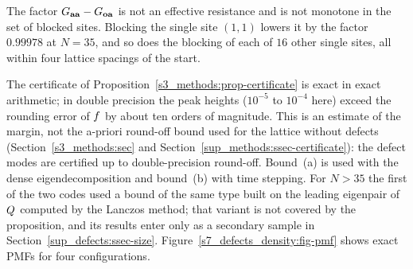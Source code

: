 The factor $G_{\mathbf{a}\mathbf{a}}-G_{\mathbf{o}\mathbf{a}}$ is not an effective resistance and is not monotone in the set of blocked sites.
Blocking the single site $(1,1)$ lowers it by the factor $0.99978$ at $N=35$, and so does the blocking of each of $16$ other
single sites, all within four lattice spacings of the start.

The certificate of Proposition~\ref{s3_methods:prop-certificate} is exact in exact arithmetic; in double precision the peak
heights ($10^{-5}$ to $10^{-4}$ here) exceed the rounding error of $f$ by about ten orders of magnitude. This is an
estimate of the margin, not the a-priori round-off bound used for the lattice without defects (Section~\ref{s3_methods:sec} and
Section~\ref{sup_methods:ssec-certificate}): the defect modes are certified up to double-precision round-off.
Bound~(a) is used with the dense eigendecomposition and bound~(b) with time stepping. For $N>35$ the first of the two
codes used a bound of the same type built on the leading eigenpair of $Q$ computed by the Lanczos method; that variant is
not covered by the proposition, and its results enter only as a secondary sample in Section~\ref{sup_defects:ssec-size}.
Figure~\ref{s7_defects_density:fig-pmf} shows exact PMFs for four configurations.
